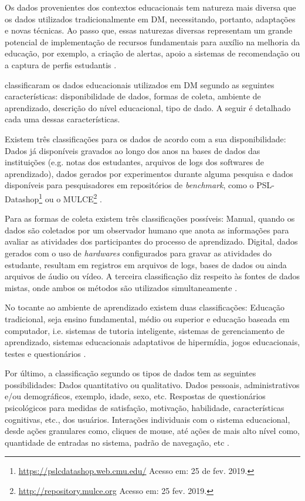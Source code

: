Os dados provenientes dos contextos educacionais tem natureza mais diversa que
os dados utilizados tradicionalmente em DM, necessitando, portanto, adaptações e
novas técnicas. Ao passo que, essas naturezas diversas representam um grande
potencial de implementação de recursos fundamentais para auxílio na melhoria da
educação, por exemplo, a criação de alertas, apoio a sistemas de recomendação ou
a captura de perfis estudantis \cite{rigo2014aplicaccoes}.

 classificaram os dados educacionais
utilizados em DM segundo as seguintes características: disponibilidade de dados,
formas de coleta, ambiente de aprendizado, descrição do nível educacional, tipo
de dado. A seguir é detalhado cada uma dessas características.

Existem três classificações para os dados de acordo com a sua disponibilidade:
Dados já disponíveis gravados ao longo dos anos na bases de dados das
instituições (e.g. notas dos estudantes, arquivos de logs dos softwares de
aprendizado), dados gerados por experimentos durante alguma pesquisa e dados
disponíveis para pesquisadores em repositórios de \textit{benchmark}, como o
PSL-Datashop\footnote{\url{https://pslcdatashop.web.cmu.edu/} Acesso em: 25 de
fev. 2019.} ou o MULCE\footnote{\url{http://repository.mulce.org} Acesso em: 25
fev. 2019.} \cite{bousbia2014contribution}.

Para as formas de coleta existem três classificações possíveis: Manual, quando
os dados são coletados por um observador humano que anota as informações para
avaliar as atividades dos participantes do processo de aprendizado. Digital,
dados gerados com o uso de \textit{hardwares} configurados para gravar as
atividades do estudante, resultam em registros em arquivos de logs, bases de
dados ou ainda arquivos de áudio ou vídeo. A terceira classificação diz respeito
às fontes de dados mistas, onde ambos os métodos são utilizados simultaneamente
\cite{bousbia2014contribution}.

No tocante ao ambiente de aprendizado existem duas classificações: Educação
tradicional, seja ensino fundamental, médio ou superior e educação baseada em
computador, i.e. sistemas de tutoria inteligente, sistemas de gerenciamento de
aprendizado, sistemas educacionais adaptativos de hipermídia, jogos
educacionais, testes e questionários \cite{romero2013data}.

Por último, a classificação segundo os tipos de dados tem as seguintes
possibilidades: Dados quantitativo ou qualitativo. Dados pessoais,
administrativos e/ou demográficos, exemplo, idade, sexo, etc. Respostas de
questionários psicológicos para medidas de satisfação, motivação, habilidade,
características cognitivas, etc., dos usuários. Interações individuais com o
sistema educacional, desde ações granulares como, cliques de mouse, até ações de
mais alto nível como, quantidade de entradas no sistema, padrão de navegação,
etc \cite{bousbia2014contribution}.

